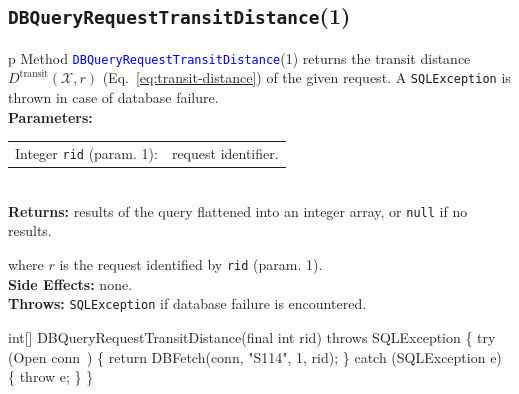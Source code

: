 \subsection{{\tt{}\protect{}DBQueryRequestTransitDistance}(1)}
\begin{tabular}{p{\textwidth}}
\toprule
{}
Method \textcolor{blue}{{\tt{}\protect{}DBQueryRequestTransitDistance}}(1) returns the
transit distance $D^\textrm{transit}(\mathcal{X},r)$
(Eq.~\ref{eq:transit-distance}) of the given request.
A {\tt{}SQLException} is thrown in case of database failure.\\
\midrule
\textbf{Parameters:}\\
\begin{tabular}{lp{116mm}}
Integer {\tt{}rid} (param. 1):&request identifier.
\end{tabular}\\
\textbf{Returns:} results of the query flattened into an integer array,
or {\tt{}null} if no results.


where $r$ is the request identified by {\tt{}rid} (param. 1).\\
\textbf{Side Effects:} none.\\
\textbf{Throws:} {\tt{}SQLException} if database failure is encountered.\\
\bottomrule
\end{tabular}
\nwenddocs{}\endmoddef{}
int[] DBQueryRequestTransitDistance(final int rid) throws SQLException \{
  try (\LA{}Open \code{}conn\edoc{}~{\nwtagstyle{}}\RA{}) \{
    return DBFetch(conn, "S114", 1, rid);
  \} catch (SQLException e) \{
    throw e;
  \}
\}
\eatline
{}\nwendcode{}\nwdocspar
